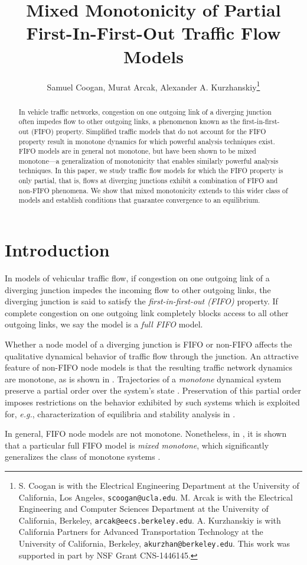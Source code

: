 \documentclass[letterpaper, 10 pt, conference]{ieeeconf}
\title{Mixed Monotonicity of Partial First-In-First-Out Traffic Flow Models}
\author{Samuel Coogan, Murat Arcak, Alexander A. Kurzhanskiy\thanks{S. Coogan is with the Electrical Engineering Department at the University of California, Los Angeles, \texttt{scoogan@ucla.edu}. M. Arcak is with the Electrical Engineering and Computer Sciences Department at the University of California, Berkeley, \texttt{arcak@eecs.berkeley.edu}. A. Kurzhanskiy is with California Partners for Advanced Transportation Technology at the University of California, Berkeley, \texttt{akurzhan@berkeley.edu}. This work was supported in part by NSF Grant CNS-1446145.}}
\begin{document}
\maketitle
\begin{abstract}
 In vehicle traffic networks, congestion on one outgoing link of a diverging junction often impedes flow to other outgoing links, a phenomenon known as the first-in-first-out (FIFO) property. Simplified traffic models that do not account for the FIFO property result in monotone dynamics for which powerful analysis techniques exist. FIFO models are in general not monotone, but have been shown to be mixed monotone---a generalization of monotonicity that enables similarly powerful analysis techniques. In this paper, we study traffic flow models for which the FIFO property is only partial, that is, flows at diverging junctions exhibit a combination of FIFO and non-FIFO phenomena.  We show that mixed monotonicity extends to this wider class of models and establish conditions that guarantee convergence to an equilibrium.


\end{abstract}
\section{Introduction}





In models of vehicular traffic flow, if congestion on one outgoing link of a diverging junction impedes the incoming flow to other outgoing links, the diverging junction is said to satisfy the \emph{first-in-first-out (FIFO)} property. If complete congestion on one outgoing link completely blocks access to all other outgoing links, we say the model is a \emph{full FIFO} model. 

Whether a node model of a diverging junction is FIFO or non-FIFO affects the qualitative dynamical behavior of traffic flow through the junction. An attractive feature of non-FIFO node models is that the resulting traffic network dynamics are monotone, as is shown in \cite{Lovisari:2014qv}. Trajectories of a \emph{monotone} dynamical system preserve a partial order over the system's state \cite{Hirsch:1985fk,Smith:2008fk}. Preservation of this partial order imposes restrictions on the behavior exhibited by such systems which is exploited for, \emph{e.g.}, characterization of equilibria and stability analysis in \cite{Lovisari:2014qv}.

In general, FIFO node models are not monotone. Nonetheless, in \cite{Coogan:2015mz}, it is shown that a particular full FIFO model is \emph{mixed monotone}, which significantly generalizes the class of monotone systems \cite{Smith:2008rr, Coogan:2014ty}. 
\end{document}
